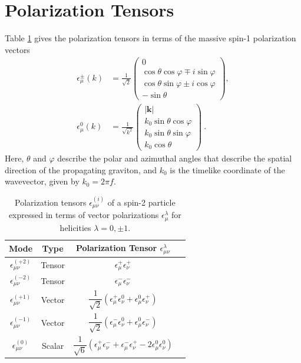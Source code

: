 \documentclass[prd,twocolumn,aps,psfig,nofootinbib,nobibnotes,superscriptaddress,preprintnumbers,times]{revtex4-2}
\begin{document}
\section{Polarization Tensors}\label{app:polarization_tensors}
Table \ref{tbl:tensors} gives the polarization tensors in terms of the massive spin-1 polarization vectors
\begin{equation}\label{eqn:pol_vec}
\begin{aligned}
    \epsilon_\mu^{\pm}(k) &= \frac{1}{\sqrt{2}} 
\begin{pmatrix}
0 \\
\cos\theta \cos\varphi \mp i \sin\varphi \\
\cos\theta \sin\varphi \pm i \cos\varphi \\
- \sin\theta
\end{pmatrix}
, \\ \epsilon_\mu^{0}(k) &= \frac{1}{\sqrt{k^2}} 
\begin{pmatrix}
|\mathbf{k}| \\
k_0 \sin\theta \cos\varphi \\
k_0 \sin\theta \sin\varphi \\
k_0 \cos\theta
\end{pmatrix} \ .
\end{aligned}
\end{equation}
Here, $\theta$ and $\varphi$ describe the polar and azimuthal angles that describe the spatial direction of the propagating graviton, and $k_0$ is the timelike coordinate of the wavevector, given by $k_0 = 2\pi f$. 
\begin{table}[h] 
\centering
\renewcommand{\arraystretch}{1.8}
\begin{tabular}{|c|c|c|l|}
\hline
\textbf{Mode} & \textbf{Type} & \textbf{Polarization Tensor $\epsilon^{\lambda}_{\mu\nu}$} \\
\hline
$\epsilon^{(+2)}_{\mu\nu}$     & Tensor  & $\epsilon^+_\mu \epsilon^+_\nu $ \\
\hline
$\epsilon^{(-2)}_{\mu\nu}$     & Tensor   & $\epsilon^-_\mu \epsilon^-_\nu $ \\
\hline
$\epsilon^{(+1)}_{\mu\nu}$     & Vector   & $\dfrac{1}{\sqrt{2}} \left( \epsilon^+_\mu \epsilon^0_\nu + \epsilon^0_\mu \epsilon^+_\nu \right)$ \\
\hline
$\epsilon^{(-1)}_{\mu\nu}$     & Vector   & $\dfrac{1}{\sqrt{2}} \left( \epsilon^-_\mu \epsilon^0_\nu + \epsilon^0_\mu \epsilon^-_\nu \right)$ \\
\hline
$\epsilon^{(0)}_{\mu\nu}$      & Scalar  & $\dfrac{1}{\sqrt{6}} \left( \epsilon^+_\mu \epsilon^-_\nu + \epsilon^-_\mu \epsilon^+_\nu - 2\epsilon^0_\mu \epsilon^0_\nu \right)$ \\
\hline
\end{tabular}
\caption{Polarization tensors $\epsilon^{(i)}_{\mu\nu}$ of a spin-2 particle expressed in terms of vector polarizations $\epsilon^\lambda_\mu$ for helicities $\lambda = 0, \pm1$.}
\label{tbl:tensors}
\end{table}
\end{document}
